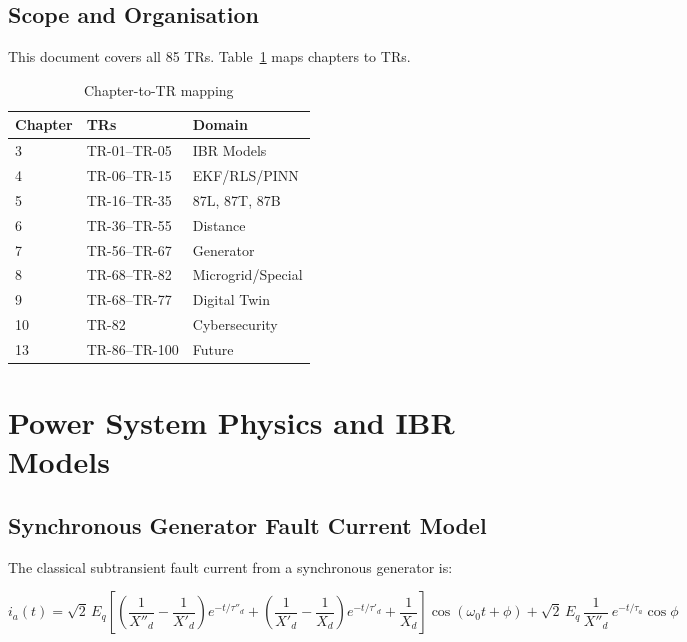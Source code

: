\documentclass[11pt,a4paper]{report}
\begin{document}
\section{Scope and Organisation}

This document covers all 85 TRs. Table~\ref{tab:scope} maps chapters to TRs.

\begin{table}[ht]
\centering
\caption{Chapter-to-TR mapping}
\label{tab:scope}
\begin{tabular}{lll}
\toprule
Chapter & TRs & Domain \\
\midrule
3 & TR-01--TR-05 & IBR Models \\
4 & TR-06--TR-15 & EKF/RLS/PINN \\
5 & TR-16--TR-35 & 87L, 87T, 87B \\
6 & TR-36--TR-55 & Distance \\
7 & TR-56--TR-67 & Generator \\
8 & TR-68--TR-82 & Microgrid/Special \\
9 & TR-68--TR-77 & Digital Twin \\
10 & TR-82 & Cybersecurity \\
13 & TR-86--TR-100 & Future \\
\bottomrule
\end{tabular}
\end{table}

\chapter{Power System Physics and IBR Models}
\label{ch:physics}

\section{Synchronous Generator Fault Current Model}

The classical subtransient fault current from a synchronous generator is:

\begin{equation}
\label{eq:sg_fault}
i_a(t) = \sqrt{2}\,E_q\left[\left(\frac{1}{X''_d}-\frac{1}{X'_d}\right)e^{-t/\tau''_d}
  + \left(\frac{1}{X'_d}-\frac{1}{X_d}\right)e^{-t/\tau'_d}
  + \frac{1}{X_d}\right]\cos(\omega_0 t + \phi)
  + \sqrt{2}\,E_q\,\frac{1}{X''_d}\,e^{-t/\tau_a}\cos\phi
\end{equation}
\end{document}
